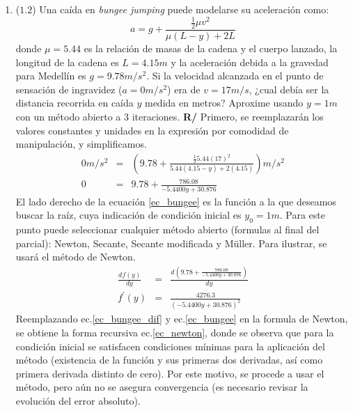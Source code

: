 \documentclass[12pt]{article}
\newcommand{\diff}[3]{\frac{d^{#3} #1}{d#2^{#3}}}
\begin{document}
\vspace{-.5cm}
  \begin{enumerate}[leftmargin=*,widest=9]
  
     \item (\(1.2\)) Una caída en \textit{bungee jumping} puede modelarse su aceleración como:
\begin{equation*}
a = g + \frac{\frac{1}{2}\mu v^2}{\mu (L-y) + 2L}
\end{equation*}
donde \(\mu=5.44\) es la relación de masas de la cadena y el cuerpo lanzado, la longitud de la cadena es \(L = 4.15m\) y la aceleración debida a la gravedad para Medellín es \(g=9.78m/s^2\). Si la velocidad alcanzada en el punto de sensación de ingravidez (\(a=0m/s^2\)) era de \(v=17m/s\), ¿cual debía ser la distancia recorrida en caída \(y\) medida en metros? Aproxime usando \(y=1m\) con un método abierto a 3 iteraciones.
\textbf{R/} Primero, se reemplazarán los valores constantes y unidades en la expresión por comodidad de manipulación, y simplificamos.
\begin{eqnarray}
0 m/s^2 & = & \left( 9.78 + \frac{\frac{1}{2}5.44 (17)^2}{5.44 (4.15-y) + 2(4.15)} \right) m/s^2 \nonumber \\
0 & = & 9.78 + \frac{786.08}{- 5.4400 y + 30.876} \label{ec_bungee}
\end{eqnarray}
El lado derecho de la ecuación \ref{ec_bungee} es la función a la que deseamos buscar la raíz, cuya indicación de condición inicial es \(y_0=1m\).
Para este punto puede seleccionar cualquier método abierto (formulas al final del parcial): Newton, Secante, Secante modificada y M\"uller.
Para ilustrar, se usará el método de Newton.
\begin{eqnarray}
\diff{f(y)}{y}{} & = & \diff{ \left(9.78 + \frac{786.08}{- 5.4400 y + 30.876} \right) }{y}{} \nonumber \\
f^{\prime}(y) & = & \frac{4276.3}{\left(- 5.4400 y + 30.876\right)^{2}} \label{ec_bungee_dif}
\end{eqnarray}
Reemplazando ec.\ref{ec_bungee_dif} y ec.\ref{ec_bungee} en la formula de Newton, se obtiene la forma recursiva ec.\ref{ec_newton}, donde se observa que para la condición inicial se satisfacen condiciones mínimas para la aplicación del método (existencia de la función y sus primeras dos derivadas, así como primera derivada distinto de cero). Por este motivo, se procede a usar el método, pero aún no se asegura convergencia (es necesario revisar la evolución del error absoluto).
\begin{equation}

\end{equation}
\end{enumerate}
\end{document}

